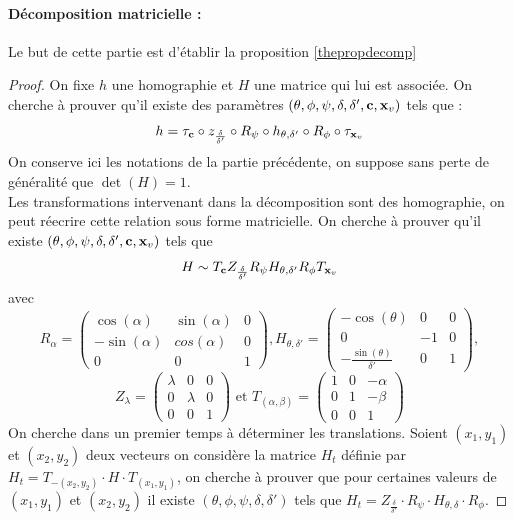 \paragraph{Décomposition matricielle :}
Le but de cette partie est d'établir la proposition \ref{thepropdecomp}

\begin{proof}
On fixe $h$ une homographie et $H$ une matrice qui lui est associée. On cherche à prouver qu'il existe des paramètres $(\theta,\phi,\psi,\delta,\delta',\mathbf{c},\mathbf{x}_v)$ tels que :
\begin{equation*}
h= \tau_{\mathbf{c}} \circ z_{\frac{\delta}{\delta'}}\circ R_{\psi} \circ h_{\theta,\delta'} \circ R_{\phi} \circ \tau_{\mathbf{x}_v}
\end{equation*}
On conserve ici les notations de la partie précédente, on suppose sans perte de généralité que $\det (H)=1$.\\
Les transformations intervenant dans la décomposition sont des homographie, on peut réecrire cette relation sous forme matricielle. On cherche à prouver qu'il existe $(\theta,\phi,\psi,\delta,\delta',\mathbf{c},\mathbf{x}_v)$ tels que
\begin{equation*}
H\sim T_{\mathbf{c}} Z_{\frac{\delta}{\delta'}}  R_{\psi}  H_{\theta,\delta'} R_{\phi}  T_{\mathbf{x}_v}
\end{equation*}
avec
\begin{equation*}
R_{\alpha}=\begin{pmatrix}
\cos(\alpha)&\sin(\alpha)&0\\-\sin(\alpha)&cos(\alpha)&0\\0&0&1
\end{pmatrix}
, H_{\theta,\delta'}=\begin{pmatrix}
-\cos(\theta)&0&0\\0&-1&0\\-\frac{\sin(\theta)}{\delta'}&0&1
\end{pmatrix},
\end{equation*}
\begin{equation*}
Z_{\lambda}=\begin{pmatrix}
\lambda&0&0\\0&\lambda&0\\0&0&1
\end{pmatrix}
\text{ et } T_{(\alpha,\beta)}=\begin{pmatrix}
1&0&-\alpha\\0&1&-\beta\\0&0&1
\end{pmatrix}
\end{equation*}
 On cherche dans un premier temps à déterminer les translations. Soient $(x_1 , y_1 )$ et $(x_2 , y_2 )$ deux vecteurs on considère la matrice $H_t$ définie par $H_t = T_{-(x_2 , y_2 )}  \cdot H \cdot T_{(x_1 , y_1 )}$, on cherche à prouver que pour certaines valeurs de $(x_1 , y_1 )$ et $(x_2 , y_2 )$  il existe  $(\theta,\phi,\psi,\delta,\delta')$ tels que   $H_t=Z_{\frac{\delta}{\delta'}} \cdot R_{\psi} \cdot H_{\theta,\delta} \cdot R_{\phi}$.
 

\end{proof}
